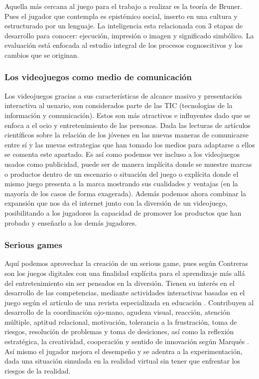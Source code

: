Aquella más cercana al juego para el trabajo a realizar es la teoría de Bruner. Pues el jugador que contempla es epistémico social, inserto en una cultura y estructurado por un lenguaje. La inteligencia esta relacionada con 3 etapas de desarrollo para conocer: ejecución, impresión o imagen y significado simbólico. La evaluación está enfocada al estudio integral de los procesos cognoscitivos y los cambios que se originan.


\subsubsection{Los videojuegos como medio de comunicación}
Los videojuegos gracias a sus características de alcance masivo y presentación interactiva al usuario, son considerados parte de las TIC (tecnologias de la información y comunicación). Estos son más atractivos e influyentes dado que se enfoca a el ocio y entretenimiento de las personas. Dada las lecturas de artículos científicos sobre la relación de los jóvenes en las nuevas maneras de comunicarse entre sí \cite{castellana2007adolescente} y las nuevas estrategias que han tomado los medios para adaptarse a ellos \cite{ignasidebofarull2005} se comenta este apartado. 
Es así como podemos ver incluso a los videojuegos usados como publicidad, puede ser de manera implícita donde se muestre marcas o productos dentro de un escenario o situación del juego o explícita donde el mismo juego presenta a la marca mostrando sus cualidades y ventajas (en la mayoría de los casos de forma exagerada). Además podemos ahora combinar la expansión que nos da el internet junto con la diversión de un videojuego, posibilitando a los jugadores la capacidad de promover los productos que han probado y enseñarlo a los demás jugadores. 


\subsubsection{Serious games}
Aquí podemos aprovechar la creación de un serious game, pues según Contreras \cite{contreras2016investigacion} son los juegos digitales con una finalidad explícita para el aprendizaje más allá del entretenimiento sin ser pensados en la diversión. Tienen su interés en el desarrollo de las competencias, mediante actividades interactivas basadas en el juego según el artículo de una revista especializada en educación \cite{romero2015serious}.
Contribuyen al desarrollo de la coordinación ojo-mano, agudeza visual, reacción, atención múltiple, aptitud relacional, motivación, tolerancia a la frustración, toma de riesgos, resolución de problemas y toma de desiciones, así como la reflexión estratégica, la creatividad, cooperación y sentido de innovación según Marqués \cite{marqués2012}. Así mismo el jugador mejora el desempeño y se adentra a la experimentación, dada una situación simulada en la realidad virtual sin tener que enfrentar los riesgos de la realidad. 
 
